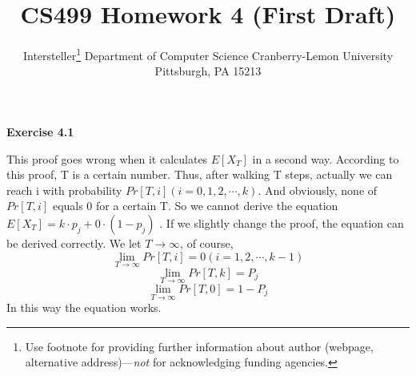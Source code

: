 \documentclass{article} %
\title{CS499 Homework 4 (First Draft)}
\author{
	Intersteller\thanks{ Use footnote for providing further information
		about author (webpage, alternative address)---\emph{not} for acknowledging
		funding agencies.}
	Department of Computer Science
	Cranberry-Lemon University
	Pittsburgh, PA 15213
}
\begin{document}
	\maketitle
	\textbf{Exercise 4.1}\par
	This proof goes wrong when it calculates $E[X_T]$ in a second way. According to this proof, T is a certain number. Thus, after walking T steps, actually we can reach i with probability $Pr[T,i] (i=0,1,2,\cdots ,k)$. And obviously, none of $Pr[T,i]$ equals 0 for a certain T. So we cannot derive the equation $E[X_T] = k\cdot p_j + 0 \cdot (1-p_j)$ .
	If we slightly change the proof, the equation can be derived correctly. We let $T\to \infty$, of course, $${\lim_{T\to \infty}} Pr[T,i]=0 (i=1,2,\cdots ,k-1)$$ $${\lim_{T\to \infty}}Pr[T,k]=P_j$$ $${\lim_{T\to \infty}} Pr[T,0]=1-P_j$$ In this way the equation works.
\end{document}

